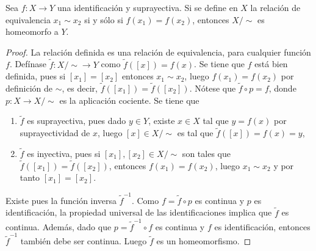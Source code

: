 

\begin{proposition}
Sea $f : X \longrightarrow Y$ una identificación y suprayectiva. Si se define en $X$ la relación de equivalencia $x_1 \sim x_2$ si y sólo si $f(x_1) = f(x_2)$, entonces $X/\sim$ es homeomorfo a $Y$.
\end{proposition}

\begin{proof}
La relación definida es una relación de equivalencia, para cualquier función $f$. Defínase $\widetilde{f} : X/\sim \longrightarrow Y$ como $\widetilde{f}([x]) = f(x)$. Se tiene que $f$ está bien definida, pues si $[x_1] = [x_2]$ entonces $x_1 \sim x_2$, luego $f(x_1) = f(x_2)$ por definición de $\sim$, es decir, $\widetilde{f}([x_1]) = \widetilde{f}([x_2])$. Nótese que $\widetilde{f} \circ p = f$, donde $p : X \longrightarrow X/\sim$ es la aplicación cociente. Se tiene que
\begin{enumerate}[label=\textnormal{(\roman*)}]
\item $\widetilde{f}$ es suprayectiva, pues dado $y \in Y$, existe $x \in X$ tal que $y = f(x)$ por suprayectividad de $x$, luego $[x] \in X/\sim$ es tal que $\widetilde{f}([x]) = f(x) = y$,
\item $\widetilde{f}$ es inyectiva, pues si $[x_1], [x_2] \in X/\sim$ son tales que $\widetilde{f}([x_1]) = \widetilde{f}([x_2])$, entonces $f(x_1) = f(x_2)$, luego $x_1 \sim x_2$ y por tanto $[x_1] = [x_2]$.
\end{enumerate}

Existe pues la función inversa $\widetilde{f}^{-1}$. Como $f = \widetilde{f} \circ p$ es continua y $p$ es identificación, la propiedad universal de las identificaciones implica que $\widetilde{f}$ es continua. Además, dado que $p = \widetilde{f}^{-1} \circ  f$ es continua y $f$ es identificación, entonces $\widetilde{f}^{-1}$ también debe ser continua. Luego $\widetilde{f}$ es un homeomorfismo.
\end{proof}
